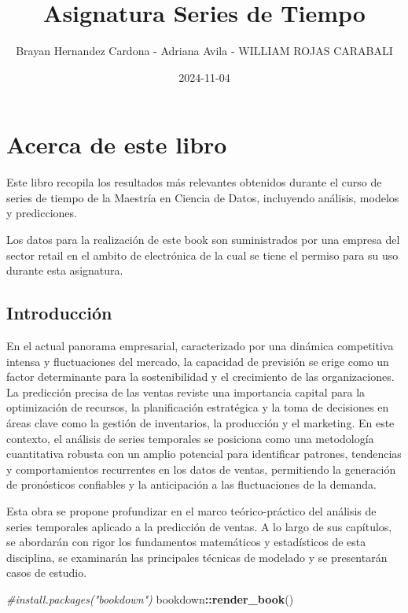 \documentclass[
]{book}
\title{Asignatura Series de Tiempo}
\author{Brayan Hernandez Cardona - Adriana Avila - WILLIAM ROJAS CARABALI}
\date{2024-11-04}
\newenvironment{Shaded}{\begin{snugshade}}{\end{snugshade}}
\newcommand{\CommentTok}[1]{\textcolor[rgb]{0.56,0.35,0.01}{\textit{#1}}}
\newcommand{\FunctionTok}[1]{\textcolor[rgb]{0.13,0.29,0.53}{\textbf{#1}}}
\newcommand{\NormalTok}[1]{#1}
\newcommand{\SpecialCharTok}[1]{\textcolor[rgb]{0.81,0.36,0.00}{\textbf{#1}}}
\begin{document}
\maketitle

{
\setcounter{tocdepth}{1}
\tableofcontents
}
\chapter{Acerca de este libro}\label{acerca-de-este-libro}

Este libro recopila los resultados más relevantes obtenidos durante el curso de series de tiempo de la Maestría en Ciencia de Datos, incluyendo análisis, modelos y predicciones.

Los datos para la realización de este book son suministrados por una empresa del sector retail en el ambito de electrónica de la cual se tiene el permiso para su uso durante esta asignatura.

\section{Introducción}\label{introducciuxf3n}

En el actual panorama empresarial, caracterizado por una dinámica competitiva intensa y fluctuaciones del mercado, la capacidad de previsión se erige como un factor determinante para la sostenibilidad y el crecimiento de las organizaciones. La predicción precisa de las ventas reviste una importancia capital para la optimización de recursos, la planificación estratégica y la toma de decisiones en áreas clave como la gestión de inventarios, la producción y el marketing. En este contexto, el análisis de series temporales se posiciona como una metodología cuantitativa robusta con un amplio potencial para identificar patrones, tendencias y comportamientos recurrentes en los datos de ventas, permitiendo la generación de pronósticos confiables y la anticipación a las fluctuaciones de la demanda.

Esta obra se propone profundizar en el marco teórico-práctico del análisis de series temporales aplicado a la predicción de ventas. A lo largo de sus capítulos, se abordarán con rigor los fundamentos matemáticos y estadísticos de esta disciplina, se examinarán las principales técnicas de modelado y se presentarán casos de estudio.

\begin{Shaded}
\begin{Highlighting}[]
\CommentTok{\#install.packages("bookdown")}
\NormalTok{bookdown}\SpecialCharTok{::}\FunctionTok{render\_book}\NormalTok{()}
\end{Highlighting}
\end{Shaded}
\end{document}

